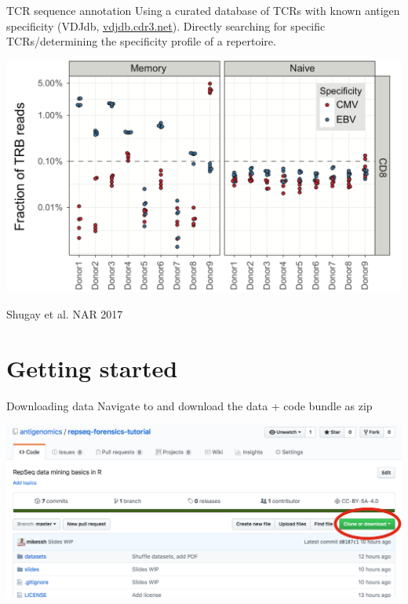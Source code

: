 \documentclass[12pt]{beamer}
\begin{document}
\begin{frame}{TCR sequence annotation}
Using a curated database of TCRs with known antigen specificity (VDJdb, \url{vdjdb.cdr3.net}). Directly searching for specific TCRs/determining the specificity profile of a repertoire.
\begin{center}
\includegraphics[scale=0.35]{p13}
\end{center}
\tiny{Shugay et al. NAR 2017}
\end{frame}

\section{Getting started}

\begin{frame}{Downloading data}
Navigate to  and download the data + code bundle as zip
\begin{center}
\includegraphics[width=\textwidth]{p7}
\end{center}
\end{frame}
\end{document}
